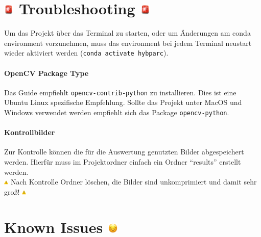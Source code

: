 \documentclass[a4paper, 10pt]{article}
\newcommand{\code}[1]{\texttt{#1}}
\begin{document}
\section{\includegraphics[height=0.65em]{emojis/police-light.png} Troubleshooting \includegraphics[height=0.65em]{emojis/police-light.png}}
\label{sec:troubleshooting}

Um das Projekt über das Terminal zu starten, oder um Änderungen am conda environment vorzunehmen, muss das environment bei jedem Terminal neustart wieder aktiviert werden (\code{conda activate hybparc}).

\paragraph{OpenCV Package Type}
Das Guide empfiehlt \code{opencv-contrib-python} zu installieren. Dies ist eine Ubuntu Linux spezifische Empfehlung. Sollte das Projekt unter MacOS und Windows verwendet werden empfiehlt sich das Package \code{opencv-python}.

\paragraph{Kontrollbilder}
Zur Kontrolle können die für die Auswertung genutzten Bilder abgespeichert werden. Hierfür muss im Projektordner einfach ein Ordner \enquote{results} erstellt werden.
\\
{\footnotesize \includegraphics[height=0.6em]{emojis/warning.png} Nach Kontrolle Ordner löschen, die Bilder sind unkomprimiert und damit sehr groß! \includegraphics[height=0.6em]{emojis/warning.png}}

\section{Known Issues \includegraphics[height=0.65em]{emojis/pensive.png}}
\label{sec:known-issues}
\end{document}

